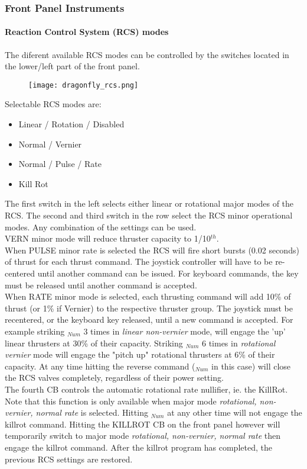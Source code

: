 \documentclass[Orbiter User Manual.tex]{subfiles}
\begin{document}
\subsubsection{Front Panel Instruments}
\paragraph{Reaction Control System (RCS) modes}
The diferent available RCS modes can be controlled by the switches located in the lower/left part of the front panel.

\begin{figure}[H]
  \centering
  \texttt{[image: dragonfly\_rcs.png]}
\end{figure}

\noindent
Selectable RCS modes are:

\begin{itemize}
\item Linear / Rotation / Disabled
\item Normal / Vernier
\item Normal / Pulse / Rate
\item Kill Rot
\end{itemize}

\noindent
The first switch in the left selects either linear or rotational major modes of the RCS. The second and third switch in the row select the RCS minor operational modes. Any combination of the settings can be used.\\
VERN minor mode will reduce thruster capacity to 1/10$^{th}$.\\
When PULSE minor rate is selected the RCS will fire short bursts (0.02 seconds) of thrust for each thrust command. The joystick controller will have to be re-centered until another command can be issued. For keyboard commands, the key must be released until another command is accepted.\\
When RATE minor mode is selected, each thrusting command will add 10\% of thrust (or 1\% if Vernier) to the respective thruster group. The joystick must be recentered, or the keyboard key released, until a new command is accepted. For example striking $_{Num}$ 3 times in \textit{linear non-vernier} mode, will engage the 'up' linear thrusters at 30\% of their capacity. Striking $_{Num}$ 6 times in \textit{rotational vernier} mode will engage the "pitch up" rotational thrusters at 6\% of their capacity. At any time hitting the reverse command ($_{Num}$ in this case) will close the RCS valves completely, regardless of their power setting.\\
The fourth CB controls the automatic rotational rate nullifier, ie. the KillRot. Note that this function is only available when major mode \textit{rotational, non-vernier, normal rate} is selected. Hitting $_{Num}$ at any other time will not engage the killrot command. Hitting the KILLROT CB on the front panel however will temporarily switch to major mode \textit{rotational, non-vernier, normal rate} then engage the killrot command. After the killrot program has completed, the previous RCS settings are restored.
\end{document}
